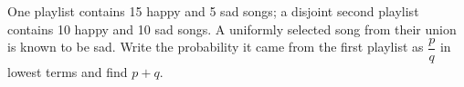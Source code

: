 One playlist contains 15 happy and 5 sad songs; a disjoint second playlist contains 10 happy and 10 sad songs. A uniformly selected song from their union is known to be sad. Write the probability it came from the first playlist as $\dfrac{p}{q}$ in lowest terms and find $p+q$.
